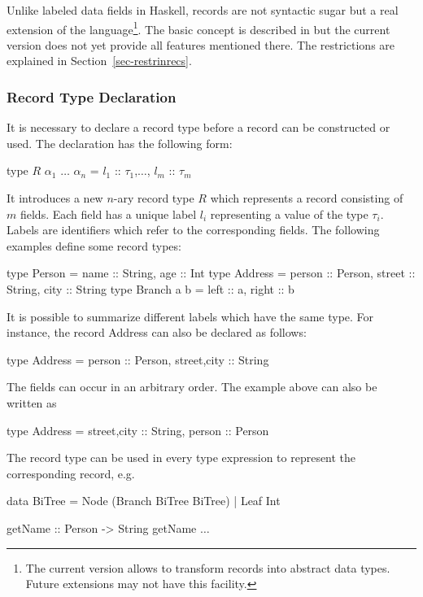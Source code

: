 \documentclass[11pt,fleqn]{article}
\renewcommand{\tt}{\usefont{OT1}{cmtt}{m}{n}\selectfont}
\newcommand{\codefont}{\small\tt}
\newcommand{\code}[1]{\mbox{\codefont #1}}
\begin{document}
Unlike labeled data fields in Haskell, records are 
not syntactic sugar but a real extension of the
language\footnote{The current version allows to transform records
  into abstract data types. Future extensions may not have
  this facility.}.
The basic concept is described in \cite{Leijen05} but the current
version does not yet provide all features mentioned there. 
The restrictions are explained in Section~\ref{sec-restrinrecs}.
 
\subsubsection{Record Type Declaration}
\label{sec-recordtypedecl}

It is necessary to declare a record type before a record
can be constructed or used. The declaration has the following form:
\begin{curry}
type $R$ $\alpha_1$ $\ldots$ $\alpha_n$ = { $l_1$ :: $\tau_1$,$\ldots$, $l_m$ :: $\tau_m$ }
\end{curry}
It introduces a new $n$-ary record type $R$ which represents a
record consisting of $m$ fields. Each field has a unique label $l_i$ 
representing a value of the type $\tau_i$. Labels
are identifiers which refer to the corresponding
fields. The following examples define some record types:
\begin{curry}
type Person = {name :: String, age :: Int}
type Address = {person :: Person, street :: String, city :: String}
type Branch a b = {left :: a, right :: b}
\end{curry}
It is possible to summarize different labels which have the same
type. For instance, the record \code{Address} can also be declared as follows:
\begin{curry}
type Address = {person :: Person, street,city :: String}
\end{curry}
The fields can occur in an arbitrary order. The example above
can also be written as
\begin{curry}
type Address = {street,city :: String, person :: Person}
\end{curry}
The record type can be used in every type expression to represent
the corresponding record, e.g.
\begin{curry}
data BiTree = Node (Branch BiTree BiTree) | Leaf Int
\end{curry}
\begin{curry}
getName :: Person -> String
getName $\ldots$
\end{curry}
\end{document}
